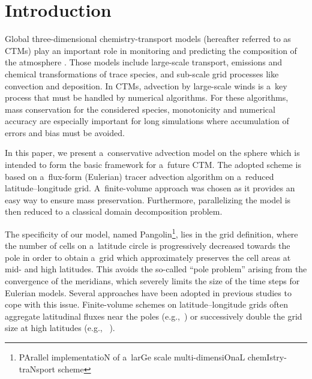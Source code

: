 \def\degre{^{\circ}}

\section*{Introduction}

     Global three-dimensional chemistry-transport models (hereafter
     referred to as CTMs) play an important role in monitoring and
     predicting the composition of the atmosphere
     \citep[e.g.,][]{Chipperfield2006,Teyssedre2007,Huijnen2010}. Those
     models include large-scale transport, emissions and chemical
     transformations of trace species, and sub-scale grid processes
     like convection and deposition. In CTMs, advection by large-scale
     winds is a~key process that must be handled by numerical
     algorithms. For these algorithms, mass conservation for
     the considered species, monotonicity and numerical accuracy are
     especially important for long simulations where accumulation of
     errors and bias must be avoided.

     In this paper, we present a~conservative advection model on the
     sphere which is intended to form the basic framework for
     a~future CTM. The adopted scheme is based on a~flux-form
     (Eulerian) tracer advection algorithm on a~reduced
     latitude--longitude grid. A~finite-volume approach was chosen as
     it provides an easy way to ensure mass preservation. Furthermore,
     parallelizing the model is then reduced to a classical domain decomposition
     problem.

     The specificity of our model, named Pangolin\footnote{PArallel
       implementatioN of a~larGe scale multi-dimensiOnaL
       chemIstry-traNsport scheme}, lies in the grid definition, where
     the number of cells on a~latitude circle is progressively
     decreased towards the pole in order to obtain a~grid which approximately
     preserves the cell areas at mid- and
     high latitudes. This avoids the so-called ``pole problem''
     arising from the convergence of the meridians, which severely
     limits the size of the time steps for Eulerian models. Several
     approaches have been adopted in previous studies to cope with
     this issue. Finite-volume schemes on latitude--longitude grids
     often aggregate latitudinal fluxes near the poles
     (e.g.,~\cite{Hourdin1999}) or successively double the grid size
     at high latitudes (e.g., ~\cite{Belikov2011}).


